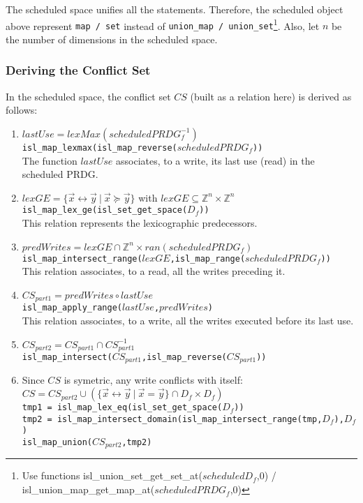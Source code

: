 \documentclass{article}
\begin{document}
The scheduled space unifies all the statements. Therefore, the scheduled object
above represent {\tt map / set} instead of {\tt union\_map /
union\_set}\footnote{Use functions isl\_union\_set\_get\_set\_at($scheduledD_f$,0) /
isl\_union\_map\_get\_map\_at($scheduledPRDG_f$,0)}. Also, let $n$ be the number of
dimensions in the scheduled space.

\subsubsection{Deriving the Conflict Set}
\label{sec:derive_cs}
In the scheduled space, the conflict set $CS$ (built as a relation here) is
derived as follows:
\begin{enumerate}
  \item $lastUse = lexMax(scheduledPRDG_f^{-1})$\\
  {\tt isl\_map\_lexmax(isl\_map\_reverse($scheduledPRDG_f$))}\\
  The function $lastUse$ associates, to a write, its last use (read) in the
  scheduled PRDG.
  \item $lexGE = \{ \vec{x} \leftrightarrow \vec{y}~|~ \vec{x} \succeq \vec{y}
  \}$ with $lexGE \subseteq \mathbb{Z}^n \times \mathbb{Z}^n$\\
  {\tt isl\_map\_lex\_ge(isl\_set\_get\_space($D_f$))}\\
  This relation represents the lexicographic predecessors.
  \item $predWrites = lexGE \cap \mathbb{Z}^n \times ran(scheduledPRDG_f)$\\
  {\tt isl\_map\_intersect\_range($lexGE$,isl\_map\_range($scheduledPRDG_f$))}\\
  This relation associates, to a read, all the writes preceding it.
  \item $CS_{part1} = predWrites \circ lastUse$\\
  {\tt isl\_map\_apply\_range($lastUse$,$predWrites$)}\\
  This relation associates, to a write, all the writes executed before its last
  use.
  \item $CS_{part2} = CS_{part1} \cap CS_{part1}^{-1}$\\
  {\tt isl\_map\_intersect($CS_{part1}$,isl\_map\_reverse($CS_{part1}$))}
  \item Since $CS$ is symetric, any write conflicts with itself:\\
  $CS = CS_{part2} \cup (\{ \vec{x} \leftrightarrow \vec{y}~|~\vec{x} =
  \vec{y}\} \cap D_f \times D_f)$\\
  {\tt tmp1 = isl\_map\_lex\_eq(isl\_set\_get\_space($D_f$))}\\
  {\tt tmp2 = isl\_map\_intersect\_domain(isl\_map\_intersect\_range(tmp,$D_f$),$D_f$)}\\
  {\tt isl\_map\_union($CS_{part2}$,tmp2)}
\end{enumerate}
\end{document}
